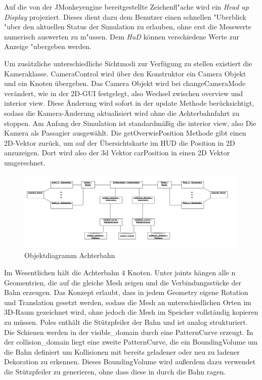 Auf die von der JMonkeyengine bereitgestellte Zeichenfl"ache wird ein \textsl{Head up Display} projeziert. Dieses dient dazu dem Benutzer einen schnellen 
"Uberblick "uber den  aktuellen Status der Simulation zu erlauben, ohne erst die Messwerte numerisch auswerten zu m"ussen. Dem \textsl{HuD} können verschiedene Werte zur
Anzeige "ubergeben werden.

Um zusätzliche unterschiedliche Sichtmodi zur Verfügung zu stellen existiert die Kameraklasse. CameraControl wird über den Konstruktor ein Camera Objekt und ein Knoten übergeben. Das Camera Objekt wird bei changeCameraMode verändert, wie in der 2D-GUI festgelegt, also Wechsel zwischen overview und interior view. Diese Änderung wird sofort in der update Methode berücksichtigt, sodass die Kamera-Änderung aktualisiert wird ohne die Achterbahnfahrt zu stoppen. Am Anfang der Simulation ist standardmäßig die interior view, also Die Kamera als Passagier ausgewählt. Die getOverwiePosition Methode gibt einen 2D-Vektor zurück, um auf der Übersichtskarte im HUD die Position in 2D anzuzeigen. Dort wird also der 3d Vektor carPosition in einen 2D Vektor umgerechnet.

\begin{figure}
\includegraphics[width=\linewidth]{bilder/objektdiagramm_004}
\caption{Objektdiagramm Achterbahn}
\label{fig:achterbahnObjects}
\end{figure}

Im Wesentlichen hält die Achterbahn 4 Knoten. Unter joints hängen alle n Geomentrien, die auf die gleiche Mesh zeigen und die Verbindungsstücke der Bahn erzeugen. Das Konzept erlaubt, dass in jedem Geometry eigene Rotation und Translation gesetzt werden, sodass die Mesh an unterschiedlichen Orten im 3D-Raum gezeichnet wird, ohne jedoch die Mesh im Speicher vollständig kopieren zu müssen. Poles enthält die Stützpfeiler der Bahn und ist analog strukturiert.
Die Schienen werden in der visible\_domain durch eine PatternCurve erzeugt. In der collision\_domain liegt eine zweite PatternCurve, die ein BoundingVolume um die Bahn definiert um Kollisionen mit bereits geladener oder neu zu ladener Dekoration zu erkennen. Dieses BoundingVolume wird außerdem dazu verwendet die Stützpfeiler zu generieren, ohne dass diese in durch die Bahn ragen.

